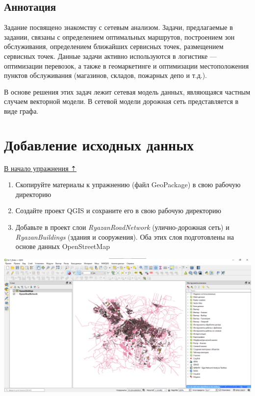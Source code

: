 \documentclass[
  12pt,
]{book}
\begin{document}
\hypertarget{networks-annotation}{%
\subsection{Аннотация}\label{networks-annotation}}

Задание посвящено знакомству с сетевым анализом. Задачи, предлагаемые в задании, связаны с определением оптимальных маршрутов, построением зон обслуживания, определением ближайших сервисных точек, размещением сервисных точек. Данные задачи активно используются в логистике --- оптимизации перевозок, а также в геомаркетинге и оптимизации местоположения пунктов обслуживания (магазинов, складов, пожарных депо и т.д.).

В основе решения этих задач лежит сетевая модель данных, являющаяся частным случаем векторной модели. В сетевой модели дорожная сеть представляется в виде графа.

\hypertarget{networks-init}{%
\section{Добавление исходных данных}\label{networks-init}}

\protect\hyperlink{networks}{В начало упражнения ⇡}

\begin{enumerate}
\def\labelenumi{\arabic{enumi}.}
\item
  Скопируйте материалы к упражнению (файл GeoPackage) в свою рабочую директорию
\item
  Создайте проект QGIS и сохраните его в свою рабочую директорию
\item
  Добавьте в проект слои \emph{RyazanRoadNetwork} (улично-дорожная сеть) и \emph{RyazanBuildings} (здания и сооружения). Оба этих слоя подготовлены на основе данных OpenStreetMap
\end{enumerate}

\includegraphics{images/Ex11_RoadNetwork/load_data.png}
\end{document}
